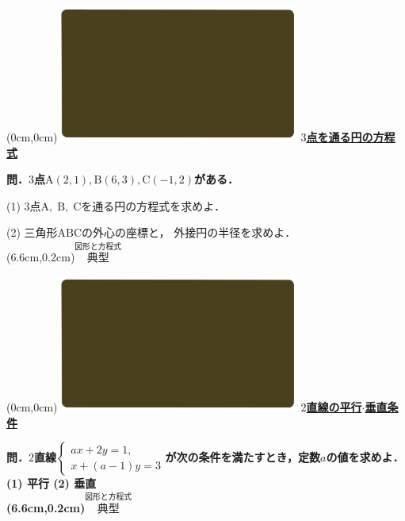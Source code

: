 \documentclass[10pt,
fleqn,
dvipdfmx,
uplatex
]{jsarticle}
\begin{document}
\newpage



\at(0cm,0cm){\includegraphics[width=8cm,bb=0 0 1920 1080]{./media_local/smart_background/図形と方程式.jpeg}}
{\color{orange}\bf\boldmath\LARGE\underline{$3$点を通る円の方程式}}\vspace{0.3zw}

\normalsize 
\bf\boldmath 問．$3$点$\text{A}\left(2,1\right),\text{B}\left(6,3\right),\text{C}\left(-1,2\right)$がある．

\normalsize
\vspace{0.3zw}
(1)  $3$点$\text{A},\;\text{B},\;\text{C}$を通る円の方程式を求めよ．

\LARGE
(2)  三角形$\text{ABC}$の外心の座標と，
外接円の半径を求めよ．\\

\at(6.6cm,0.2cm){\small\color{bradorange}$\overset{\text{図形と方程式}}{\text{典型}}$}


\newpage



\at(0cm,0cm){\includegraphics[width=8cm,bb=0 0 1920 1080]{./media_local/smart_background/図形と方程式.jpeg}}
{\color{orange}\bf\boldmath\Large\underline{$2$直線の平行$\cdot$垂直条件}}\vspace{0.3zw}

\Large 
\bf\boldmath 問．$2$直線$\left\{\begin{array}{l}ax+2y=1,\\x+\left(a-1\right)y=3\end{array}\right.$が次の条件を満たすとき，定数$a$の値を求めよ．
(1)  平行 \hspace{0.2zw} (2)  垂直\\


\at(6.6cm,0.2cm){\small\color{bradorange}$\overset{\text{図形と方程式}}{\text{典型}}$}
\end{document}
